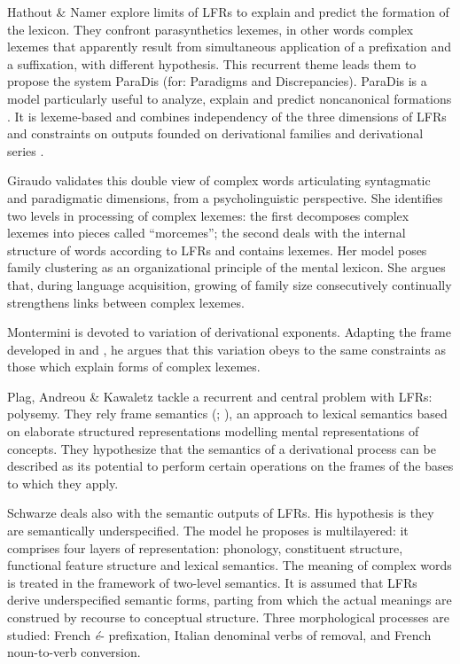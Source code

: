 \documentclass[output=paper]{langsci/langscibook}
\begin{document}
Hathout \& Namer explore limits of LFRs to explain and predict the
formation of the lexicon. They confront parasynthetics lexemes, in other
words complex lexemes that apparently result from simultaneous
application of a prefixation and a suffixation, with different
hypothesis. This recurrent theme leads them to propose the system ParaDis
(for: Paradigms and Discrepancies). ParaDis is a model particularly
useful to analyze, explain and predict noncanonical 
formations \citep{Corbett10}. It is lexeme-based and combines independency of the three
dimensions of LFRs \citep{Fradin03} and constraints on outputs founded on
derivational families and derivational series \citep{Hathout11,Blevins14}.

Giraudo validates this double view of complex words articulating
syntagmatic and paradigmatic dimensions, from a psycholinguistic
perspective. She identifies two levels in processing of complex lexemes:
the first decomposes complex lexemes into pieces called ``morcemes''; the
second deals with the internal structure of words according to LFRs and
contains lexemes. Her model poses family clustering as an organizational
principle of the mental lexicon. She argues that, during language
acquisition, growing of family size consecutively continually strengthens
links between complex lexemes.

Montermini is devoted to variation of derivational exponents. Adapting
the frame developed in \citet{Plenat-Roche2014} and \citet{Roche14,Roche16}, he argues that this variation obeys to the same constraints as
those which explain forms of complex lexemes.

Plag, Andreou \& Kawaletz tackle a recurrent and central problem with
LFRs: polysemy. They rely frame semantics (\citealt{Barsalou.1992a,Barsalou.1992b}; \citealt{Lobner13}), an approach to lexical semantics based on elaborate structured representations modelling mental representations of
concepts. They hypothesize that the semantics of a derivational process
can be described as its potential to perform certain operations on the
frames of the bases to which they apply.

Schwarze deals also with the semantic outputs of LFRs. His hypothesis is
they are semantically underspecified. The model he proposes is
multilayered: it comprises four layers of representation: phonology,
constituent structure, functional feature structure and lexical
semantics. The meaning of complex words is treated in the framework of
two-level semantics. It is assumed that LFRs derive underspecified
semantic forms, parting from which the actual meanings are construed by
recourse to conceptual structure. Three morphological processes are
studied: French \emph{é}- prefixation, Italian denominal verbs of
removal, and French noun-to-verb conversion.
\end{document}

